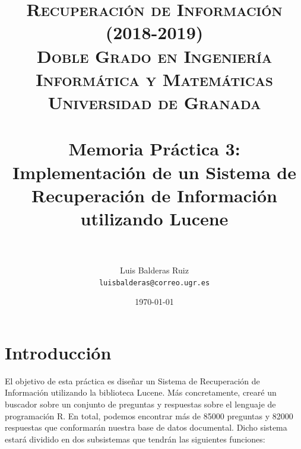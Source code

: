 
\graphicspath{ {./images/} }
\usepackage{subcaption}
\usepackage{hyperref}
\usepackage{soul}


\title{	
\normalfont \normalsize 
\textsc{\textbf{Recuperación de Información (2018-2019)} \\ Doble Grado en Ingeniería Informática y Matemáticas \\ Universidad de Granada} \\ [25pt] %
\horrule{0.5pt} \\[0.4cm] %
\huge Memoria Práctica 3: \\Implementación de un Sistema de
Recuperación de Información utilizando
Lucene \\ %
\horrule{2pt} \\[0.5cm] %
}

\author{Luis Balderas Ruiz \\ \texttt{luisbalderas@correo.ugr.es}} 


\date{\normalsize\today} %




\maketitle %

\newpage %

\tableofcontents %

\newpage

\section{Introducción}

El objetivo de esta práctica es diseñar un Sistema de Recuperación de Información utilizando la biblioteca Lucene. Más concretamente, crearé un buscador sobre un conjunto de preguntas y respuestas sobre el lenguaje de programación R. En total, podemos encontrar más de 85000 preguntas y 82000 respuestas que conformarán nuestra base de datos documental. Dicho sistema estará dividido en dos subsistemas que tendrán las siguientes funciones:

